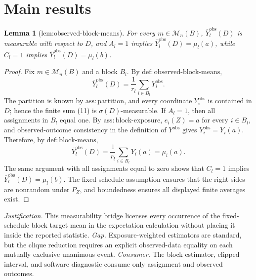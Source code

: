 \documentclass{article}
\newtheorem{lemma}{Lemma}
\begin{document}
\section{Main results}

\begin{lemma}[lem:observed-block-means]\label{lem:observed-block-means}
For every \(m\in\mathcal M_n(B)\), \(\overline Y_l^{\mathrm{obs}}(D)\) is measurable with respect to \(D\), and \(A_l=1\) implies \(\overline Y_l^{\mathrm{obs}}(D)=\mu_l(a)\), while \(C_l=1\) implies \(\overline Y_l^{\mathrm{obs}}(D)=\mu_l(b)\).
\end{lemma}
\begin{proof}
Fix \(m\in\mathcal M_n(B)\) and a block \(B_l\).  By
\(\mathrm{def{:}observed\text{-}block\text{-}means}\),
\[
 \overline Y_l^{\mathrm{obs}}(D)
 =\frac1{r_l}\sum_{i\in B_l}Y_i^{\mathrm{obs}}.
\tag{11}
\]
The partition is known by \(\mathrm{ass{:}partition}\), and every
coordinate \(Y_i^{\mathrm{obs}}\) is contained in \(D\); hence the
finite sum (11) is \(\sigma(D)\)-measurable.  If \(A_l=1\), then all
assignments in \(B_l\) equal one.  By
\(\mathrm{ass{:}block\text{-}exposure}\), \(e_i(Z)=a\) for every
\(i\in B_l\), and observed-outcome consistency in the definition of
\(Y^{\mathrm{obs}}\) gives \(Y_i^{\mathrm{obs}}=Y_i(a)\).
Therefore, by \(\mathrm{def{:}block\text{-}means}\),
\[
 \overline Y_l^{\mathrm{obs}}(D)
 =\frac1{r_l}\sum_{i\in B_l}Y_i(a)=\mu_l(a).
\]
The same argument with all assignments equal to zero shows that
\(C_l=1\) implies
\(\overline Y_l^{\mathrm{obs}}(D)=\mu_l(b)\).
The fixed-schedule assumption ensures that the right sides are
nonrandom under \(P_Z\), and boundedness ensures all displayed finite
averages exist.
\end{proof}
\par\smallskip\noindent \textit{Justification.} This measurability bridge licenses every occurrence of the fixed-schedule block target mean in the expectation calculation without placing it inside the reported statistic. \textit{Gap.} Exposure-weighted estimators are standard, but the clique reduction requires an explicit observed-data equality on each mutually exclusive unanimous event. \textit{Consumer.} The block estimator, clipped interval, and software diagnostic consume only assignment and observed outcomes.
\end{document}
